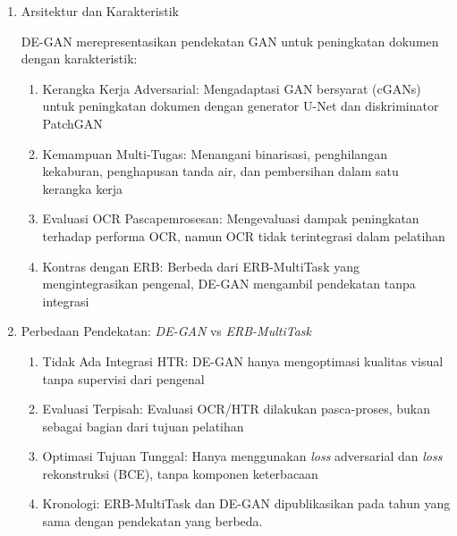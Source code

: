 \documentclass[12pt,a4paper]{article}
\begin{document}
\begin{enumerate}[leftmargin=*, labelindent=0pt, itemsep=1ex, topsep=0pt]

\item Arsitektur dan Karakteristik
\label{para:degan-arsitektur}

DE-GAN merepresentasikan pendekatan GAN untuk peningkatan dokumen dengan karakteristik:

\begin{enumerate}[leftmargin=1.5em, labelsep=0.5em, itemindent=0pt, label=\alph*., topsep=0pt, parsep=0pt, itemsep=0pt]
      \item Kerangka Kerja Adversarial: Mengadaptasi GAN bersyarat (cGANs) untuk peningkatan dokumen dengan generator U-Net dan diskriminator PatchGAN
      \item Kemampuan Multi-Tugas: Menangani binarisasi, penghilangan kekaburan, penghapusan tanda air, dan pembersihan dalam satu kerangka kerja
      \item Evaluasi OCR Pascapemrosesan: Mengevaluasi dampak peningkatan terhadap performa OCR, namun OCR tidak terintegrasi dalam pelatihan
      \item Kontras dengan ERB: Berbeda dari ERB-MultiTask \parencite{souibgui2021erb} yang mengintegrasikan pengenal, DE-GAN mengambil pendekatan tanpa integrasi
\end{enumerate}

\item Perbedaan Pendekatan: \textit{DE-GAN} vs \textit{ERB-MultiTask}
\label{para:degan-perbedaan}

\begin{enumerate}[leftmargin=1.5em, labelsep=0.5em, itemindent=0pt, label=\alph*., topsep=0pt, parsep=0pt, itemsep=0pt]
      \item Tidak Ada Integrasi HTR: DE-GAN hanya mengoptimasi kualitas visual tanpa supervisi dari pengenal
      \item Evaluasi Terpisah: Evaluasi OCR/HTR dilakukan pasca-proses, bukan sebagai bagian dari tujuan pelatihan
      \item Optimasi Tujuan Tunggal: Hanya menggunakan \textit{loss} adversarial dan \textit{loss} rekonstruksi (BCE), tanpa komponen keterbacaan
      \item Kronologi: ERB-MultiTask dan DE-GAN dipublikasikan pada tahun yang sama dengan pendekatan yang berbeda.
\end{enumerate}

\end{enumerate}
\end{document}

